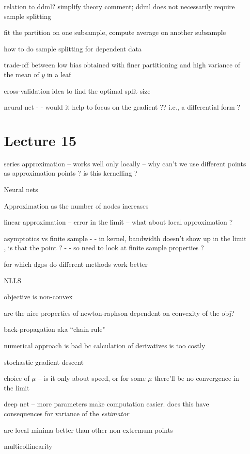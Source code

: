 \documentclass[a4paper,12pt,twoside]{article}
\begin{document}
relation to ddml? simplify theory comment; ddml does not necessarily require sample splitting

fit the partition on one subsample, compute average on another subsample

how to do sample splitting for dependent data

trade-off between low bias obtained with finer partitioning and high variance of the mean of $y$ in a leaf



cross-validation idea to find the optimal split size


neural net - - would it help to focus on the gradient ?? i.e., a differential form ?


\section*{Lecture 15}


series approximation -- works well only locally -- why can't we use different points as approximation points ? is this kernelling ?


Neural nets

Approximation as the number of nodes increases

linear approximation -- error in the limit -- what about local approximation ?


asymptotics vs finite sample - - in kernel, bandwidth doesn't show up in the limit , is that the point ? - - so need to look at finite sample properties ?


for which dgps do different methods work better


NLLS

objective is non-convex

are the nice properties of newton-raphson dependent on convexity of the obj?


back-propagation aka ``chain rule''

numerical approach is bad bc calculation of derivatives is too costly


stochastic gradient descent

choice of $\mu$ -- is it only about speed, or for some $\mu$ there'll be no convergence in the limit


deep net -- more parameters make computation easier.
does this have consequences for variance of the \textit{estimator}

are local minima better than other non extremum points

multicollinearity
\end{document}
